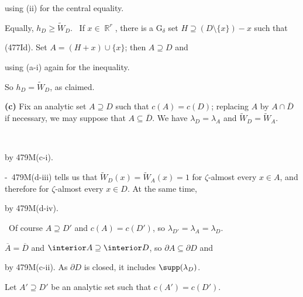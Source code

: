 {\noindent using (ii) for the central equality.\ \Qed

Equally, $h_D\ge\tilde W_D$.   \Prf\ If $x\in\BbbR^r$,
there is a G$_{\delta}$ set $H\supseteq(D\setminus\{x\})-x$ such that


\noindent (477Id).   Set $A=(H+x)\cup\{x\}$;  then $A\supseteq D$ and


\noindent using (a-i) again for the inequality.\ \Qed

So $h_D=\tilde W_D$, as claimed.

\medskip

{\bf (c)} Fix an analytic set $A\supseteq D$ such that $c(A)=c(D)$;
replacing $A$ by $A\cap\overline{D}$ if necessary, we may suppose that
$A\subseteq\overline{D}$.   We have
$\lambda_D=\lambda_A$ and $\tilde W_D=\tilde W_A$.

\medskip

\grheada\


\noindent by 479M(c-i).

\medskip

\qquad\grheadb-\grheadc\ 479M(d-iii) tells us that
$\tilde W_D(x)=\tilde W_A(x)=1$ for $\zeta$-almost every $x\in A$, and
therefore for $\zeta$-almost every $x\in D$.
At the same time,


\noindent by 479M(d-iv).

\medskip

\qquad\grheadd\ Of course $A\supseteq D'$ and $c(A)=c(D')$, so
$\lambda_{D'}=\lambda_A=\lambda_D$.

\medskip

$\overline{A}=\overline{D}$ and $\interior A\supseteq\interior D$, so
$\partial A\subseteq\partial D$ and


\noindent by 479M(c-ii).   As $\partial D$ is closed, it includes
$\supp(\lambda_D)$.

\medskip

 Let $A'\supseteq D'$ be an analytic set such that
$c(A')=c(D')$.

}
